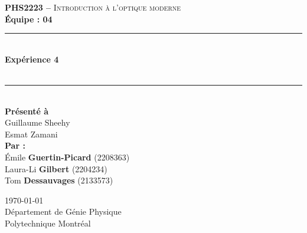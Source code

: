 \documentclass[11pt,letterpaper]{article}
\begin{document}
\begin{titlepage}
\center

\begin{figure}
\end{figure}
\vspace*{2 cm}

\textsc{\Large \textbf{PHS2223 --} Introduction à l'optique moderne}\\[0.5cm]
\large{\textbf{Équipe : 04}}\\[1.5cm]

\rule{\linewidth}{0.5mm} \\[0.5cm]
\Large{\textbf{Expérience 4}} \\[0.2cm]
\\
\rule{\linewidth}{0.2mm} \\[2.3cm]

\large{\textbf{Présenté à}\\
  Guillaume Sheehy\\
  Esmat Zamani\\[2.5cm]
  \textbf{Par :}\\
  Émile \textbf{Guertin-Picard} (2208363)\\
  Laura-Li \textbf{Gilbert} (2204234)\\
  Tom \textbf{Dessauvages} (2133573)\\[3cm]}

\large{\today\\
Département de Génie Physique\\
Polytechnique Montréal\\}

\end{titlepage}


\tableofcontents
{}
\newpage

\pagestyle{fancy}
\setlength{\headheight}{14pt}
\renewcommand{\headrulewidth}{0pt}
\fancyfoot[R]{\thepage}

\pagestyle{fancy}
\fancyhf{}
\renewcommand{\headrulewidth}{1pt}
\fancyhead[R]{\today}
\fancyfoot[R]{\thepage}

\setcounter{page}{1}

\end{document}
